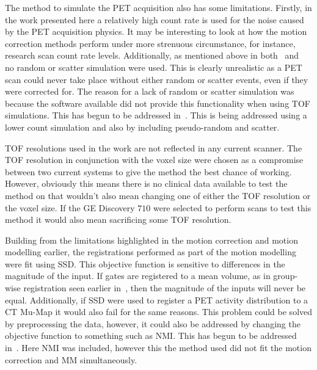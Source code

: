         The method to simulate the \gls{PET} acquisition also has some limitations. Firstly, in the work presented here a relatively high count rate is used for the noise caused by the \gls{PET} acquisition physics. It may be interesting to look at how the motion correction methods perform under more strenuous circumstance, for instance, research scan count rate levels. Additionally, as mentioned above in both~ and~ no random or scatter simulation were used. This is clearly unrealistic as a \gls{PET} scan could never take place without either random or scatter events, even if they were corrected for. The reason for a lack of random or scatter simulation was because the software available did not provide this functionality when using \gls{TOF} simulations. This has begun to be addressed in~. This is being addressed using a lower count simulation and also by including pseudo-random and scatter.
        
        \gls{TOF} resolutions used in the work are not reflected in any current scanner. The \gls{TOF} resolution in conjunction with the voxel size were chosen as a compromise between two current systems to give the method the best chance of working. However, obviously this means there is no clinical data available to test the method on that wouldn't also mean changing one of either the \gls{TOF} resolution or the voxel size. If the \gls{GE} Discovery $710$ were selected to perform scans to test this method it would also mean sacrificing some \gls{TOF} resolution.
        
        Building from the limitations highlighted in the motion correction and motion modelling earlier, the registrations performed as part of the motion modelling were fit using \gls{SSD}. This objective function is sensitive to differences in the magnitude of the input. If gates are registered to a mean volume, as in group-wise registration seen earlier in~, then the magnitude of the inputs will never be equal. Additionally, if \gls{SSD} were used to register a \gls{PET} activity distribution to a \gls{CT} \gls{Mu-Map} it would also fail for the same reasons. This problem could be solved by preprocessing the data, however, it could also be addressed by changing the objective function to something such as \gls{NMI}. This has begun to be addressed in~. Here \gls{NMI} was included, however this the method used did not fit the motion correction and \gls{MM} simultaneously.
        
